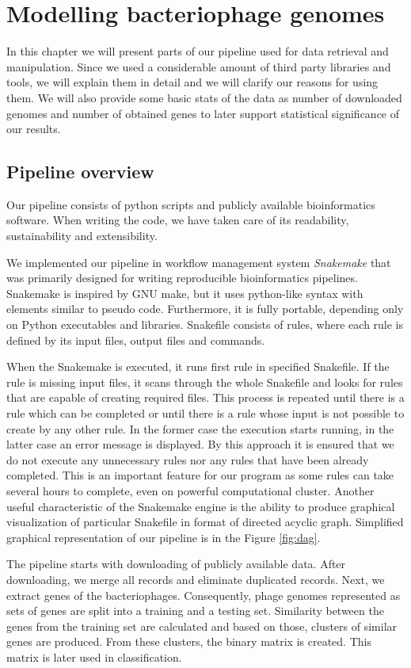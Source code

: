 \chapter{Modelling bacteriophage genomes}
In this chapter we will present parts of our pipeline used for data retrieval and manipulation.
Since we used a considerable amount of third party libraries and tools, we will explain them in detail and we will clarify our reasons for using them.
We will also provide some basic stats of the data as number of downloaded genomes and number of obtained genes to later support statistical significance of our results.

\section{Pipeline overview}
Our pipeline consists of python scripts and publicly available bioinformatics software.
When writing the code, we have taken care of its readability, sustainability and extensibility.

We implemented our pipeline in  workflow management system \emph{Snakemake} \cite{} that was primarily designed for writing reproducible bioinformatics pipelines.
Snakemake is inspired by GNU make, but it uses python-like syntax with elements similar to pseudo code.
Furthermore, it is fully portable, depending only on Python executables and libraries.
Snakefile consists of rules, where each rule is defined by its input files, output files and commands.

When the Snakemake is executed, it runs first rule in specified Snakefile.
If the rule is missing input files, it scans through the whole Snakefile and looks for rules that are capable of creating required files.
This process is repeated until there is a rule which can be completed or until there is a rule whose input is not possible to create by any other rule.
In the former case the execution starts running, in the latter case an error message is displayed.
By this approach it is ensured that we do not execute any unnecessary rules nor any rules that have been already completed.
This is an important feature for our program as some rules can take several hours to complete, even on powerful computational cluster.
Another useful characteristic of the Snakemake engine is the ability to produce graphical visualization of particular Snakefile in format of directed acyclic graph.
Simplified graphical representation of our pipeline is in the Figure \ref{fig:dag}.

The pipeline starts with downloading of publicly available data.
After downloading, we merge all records and eliminate duplicated records.
Next, we extract genes of the bacteriophages.
Consequently, phage genomes represented as sets of genes are split into a training and a testing set.
Similarity between the genes from the training set are calculated and based on those, clusters of similar genes are produced.
From these clusters, the binary matrix is created.
This matrix is later used in classification.

